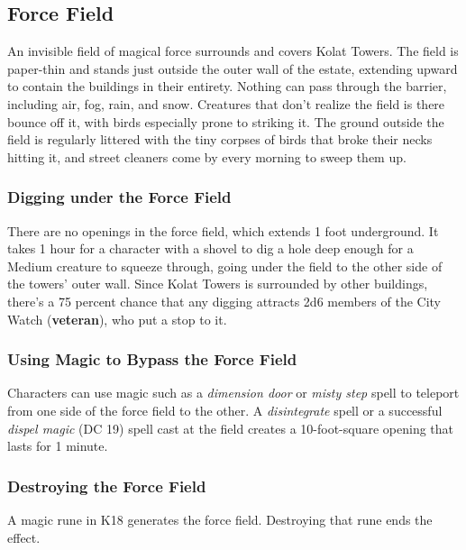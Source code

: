 \documentclass[10pt,a4paper,twoside,twocolumn,openany,nodeprecatedcode]{dndbook}
\begin{document}
\subsection{Force Field}
An invisible field of magical force surrounds and covers Kolat Towers. The field is paper-thin and stands just outside the outer wall of the estate, extending upward to contain the buildings in their entirety. Nothing can pass through the barrier, including air, fog, rain, and snow. Creatures that don't realize the field is there bounce off it, with birds especially prone to striking it. The ground outside the field is regularly littered with the tiny corpses of birds that broke their necks hitting it, and street cleaners come by every morning to sweep them up.
\subsubsection{Digging under the Force Field}
There are no openings in the force field, which extends 1 foot underground. It takes 1 hour for a character with a shovel to dig a hole deep enough for a Medium creature to squeeze through, going under the field to the other side of the towers' outer wall. Since Kolat Towers is surrounded by other buildings, there's a 75 percent chance that any digging attracts 2d6 members of the City Watch (\textbf{veteran}), who put a stop to it.
\subsubsection{Using Magic to Bypass the Force Field}
Characters can use magic such as a \textit{dimension door} or \textit{misty step} spell to teleport from one side of the force field to the other. A \textit{disintegrate} spell or a successful \textit{dispel magic} (DC 19) spell cast at the field creates a 10-foot-square opening that lasts for 1 minute.
\subsubsection{Destroying the Force Field}
A magic rune in K18 generates the force field. Destroying that rune ends the effect.
\end{document}
